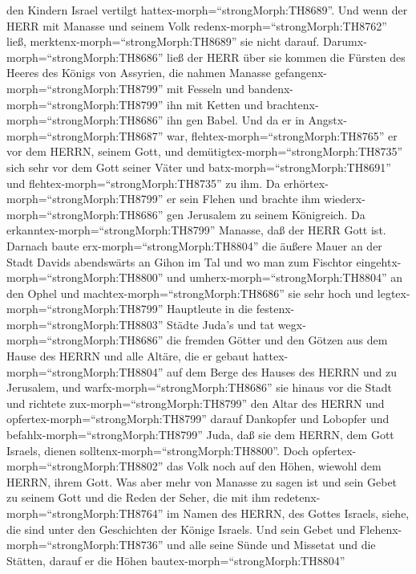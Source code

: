 den Kindern Israel vertilgt hattex-morph=``strongMorph:TH8689''.
 Und wenn der HERR mit Manasse und seinem Volk
redenx-morph=``strongMorph:TH8762'' ließ,
merktenx-morph=``strongMorph:TH8689'' sie nicht darauf. 
Darumx-morph=``strongMorph:TH8686'' ließ der HERR über sie kommen die
Fürsten des Heeres des Königs von Assyrien, die nahmen Manasse
gefangenx-morph=``strongMorph:TH8799'' mit Fesseln und
bandenx-morph=``strongMorph:TH8799'' ihn mit Ketten und
brachtenx-morph=``strongMorph:TH8686'' ihn gen Babel.  Und
da er in Angstx-morph=``strongMorph:TH8687'' war,
flehtex-morph=``strongMorph:TH8765'' er vor dem HERRN, seinem Gott, und
demütigtex-morph=``strongMorph:TH8735'' sich sehr vor dem Gott seiner
Väter  und batx-morph=``strongMorph:TH8691'' und
flehtex-morph=``strongMorph:TH8735'' zu ihm. Da
erhörtex-morph=``strongMorph:TH8799'' er sein Flehen und brachte ihm
wiederx-morph=``strongMorph:TH8686'' gen Jerusalem zu seinem Königreich.
Da erkanntex-morph=``strongMorph:TH8799'' Manasse, daß der HERR Gott
ist.  Darnach baute erx-morph=``strongMorph:TH8804'' die
äußere Mauer an der Stadt Davids abendswärts an Gihon im Tal und wo man
zum Fischtor eingehtx-morph=``strongMorph:TH8800'' und
umherx-morph=``strongMorph:TH8804'' an den Ophel und
machtex-morph=``strongMorph:TH8686'' sie sehr hoch und
legtex-morph=``strongMorph:TH8799'' Hauptleute in die
festenx-morph=``strongMorph:TH8803'' Städte Juda's  und tat
wegx-morph=``strongMorph:TH8686'' die fremden Götter und den Götzen aus
dem Hause des HERRN und alle Altäre, die er gebaut
hattex-morph=``strongMorph:TH8804'' auf dem Berge des Hauses des HERRN
und zu Jerusalem, und warfx-morph=``strongMorph:TH8686'' sie hinaus vor
die Stadt  und richtete zux-morph=``strongMorph:TH8799''
den Altar des HERRN und opfertex-morph=``strongMorph:TH8799'' darauf
Dankopfer und Lobopfer und befahlx-morph=``strongMorph:TH8799'' Juda,
daß sie dem HERRN, dem Gott Israels, dienen
solltenx-morph=``strongMorph:TH8800''.  Doch
opfertex-morph=``strongMorph:TH8802'' das Volk noch auf den Höhen,
wiewohl dem HERRN, ihrem Gott.  Was aber mehr von Manasse
zu sagen ist und sein Gebet zu seinem Gott und die Reden der Seher, die
mit ihm redetenx-morph=``strongMorph:TH8764'' im Namen des HERRN, des
Gottes Israels, siehe, die sind unter den Geschichten der Könige
Israels.  Und sein Gebet und
Flehenx-morph=``strongMorph:TH8736'' und alle seine Sünde und Missetat
und die Stätten, darauf er die Höhen bautex-morph=``strongMorph:TH8804''
